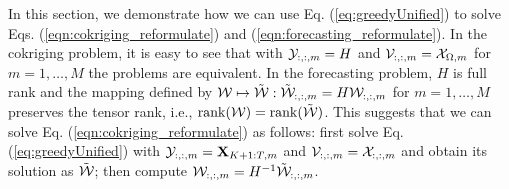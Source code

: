 In this section, we demonstrate how we can use Eq. (\ref{eq:greedyUnified}) to solve Eqs. (\ref{eqn:cokriging_reformulate}) and (\ref{eqn:forecasting_reformulate}). In the cokriging problem, it is easy to see that with ${\mathcal Y}_{:,:,m} = H$ and ${\mathcal V}_{:,:,m} = {\mathcal X}_{\Omega, m}$ for $m = 1, \ldots, M$ the problems are equivalent. In the forecasting problem, $H$ is full rank and the mapping defined by  ${\mathcal W} \mapsto \tilde{{\mathcal W}}: \tilde{{\mathcal W}}_{:,:,m} = H{\mathcal W}_{:,:,m}$ for $m=1, \ldots, M$ preserves the tensor rank, i.e., $\mathrm{rank}({\mathcal W}) = \mathrm{rank}(\tilde{{\mathcal W}})$. This suggests that we can solve Eq. (\ref{eqn:cokriging_reformulate}) as follows: first solve Eq. (\ref{eq:greedyUnified}) with ${\mathcal Y}_{:,:,m} = \mathbf{X}_{K+1:T, m}$ and ${\mathcal V}_{:,:,m} = {\mathcal X}_{:,:,m}$ and obtain its solution as $\tilde{{\mathcal W}}$; then compute ${\mathcal W}_{:,:,m} = H^{-1}\tilde{{\mathcal W}}_{:,:,m}$.
